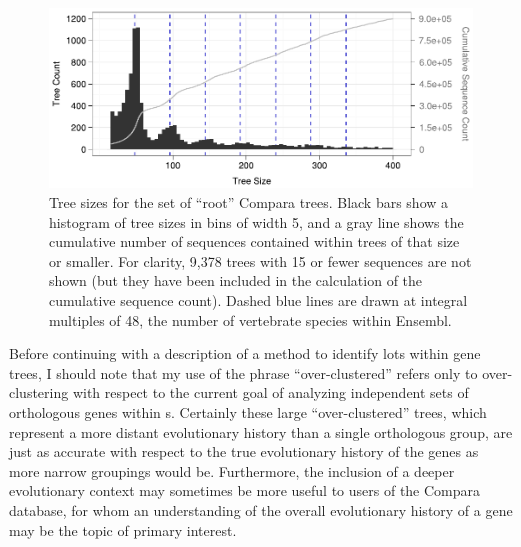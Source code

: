 \begin{figure}
\centering
\includegraphics[scale=0.9]{Figs/hist_ens_roots.pdf}
\caption{Tree sizes for the set of ``root'' Compara trees. Black bars
  show a histogram of tree sizes in bins of width 5, and a gray line
  shows the cumulative number of sequences contained within trees of
  that size or smaller. For clarity, 9,378 trees with 15 or fewer
  sequences are not shown (but they have been included in the
  calculation of the cumulative sequence count). Dashed blue lines are
  drawn at integral multiples of 48, the number of vertebrate species
  within Ensembl.}
\label{fig_ensembl_roots_hist}
\end{figure}

Before continuing with a description of a method to identify \acp{lot}
within \cmp gene trees, I should note that my use of the phrase
``over-clustered'' refers only to over-clustering with respect to the
current goal of analyzing independent sets of orthologous genes within
\mamml{}s. Certainly these large ``over-clustered'' trees, which
represent a more distant evolutionary history than a single \mammln
orthologous group, are just as accurate with respect to the true
evolutionary history of the genes as more narrow groupings would
be. Furthermore, the inclusion of a deeper evolutionary context may
sometimes be more useful to users of the Compara database, for whom an
understanding of the overall evolutionary history of a gene may be the
topic of primary interest.

